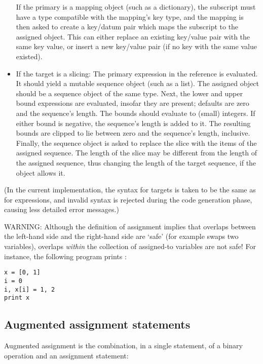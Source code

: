 \begin{itemize}
If the primary is a mapping object (such as a dictionary), the subscript must
have a type compatible with the mapping's key type, and the mapping is
then asked to create a key/datum pair which maps the subscript to
the assigned object.  This can either replace an existing key/value
pair with the same key value, or insert a new key/value pair (if no
key with the same value existed).

\item
If the target is a slicing: The primary expression in the reference is
evaluated.  It should yield a mutable sequence object (such as a list).  The
assigned object should be a sequence object of the same type.  Next,
the lower and upper bound expressions are evaluated, insofar they are
present; defaults are zero and the sequence's length.  The bounds
should evaluate to (small) integers.  If either bound is negative, the
sequence's length is added to it.  The resulting bounds are clipped to
lie between zero and the sequence's length, inclusive.  Finally, the
sequence object is asked to replace the slice with the items of the
assigned sequence.  The length of the slice may be different from the
length of the assigned sequence, thus changing the length of the
target sequence, if the object allows it.

\end{itemize}
        
(In the current implementation, the syntax for targets is taken
to be the same as for expressions, and invalid syntax is rejected
during the code generation phase, causing less detailed error
messages.)

WARNING: Although the definition of assignment implies that overlaps
between the left-hand side and the right-hand side are `safe' (for example
 swaps two variables), overlaps \emph{within} the
collection of assigned-to variables are not safe!  For instance, the
following program prints \samp{[0, 2]}:

\begin{verbatim}
x = [0, 1]
i = 0
i, x[i] = 1, 2
print x
\end{verbatim}


\subsection{Augmented assignment statements \label{augassign}}

Augmented assignment is the combination, in a single statement, of a binary
operation and an assignment statement:

